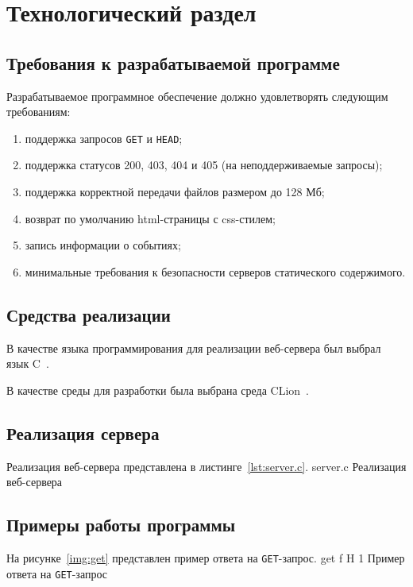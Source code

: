 \chapter{Технологический раздел}

\section{Требования к разрабатываемой программе}

Разрабатываемое программное обеспечение должно удовлетворять следующим требованиям:
\begin{enumerate}
	\item поддержка запросов \texttt{GET} и \texttt{HEAD};
	\item поддержка статусов 200, 403, 404 и 405 (на неподдерживаемые запросы);
	\item поддержка корректной передачи файлов размером до 128 Мб;
	\item возврат по умолчанию html-страницы с css-стилем;
	\item запись информации о событиях;
	\item минимальные требования к безопасности серверов статического содержимого.
\end{enumerate}

\section{Средства реализации}

В качестве языка программирования для реализации веб-сервера был выбрал язык C~\cite{c}.

В качестве среды для разработки была выбрана среда CLion~\cite{clion}.

\clearpage
\section{Реализация сервера}

Реализация веб-сервера представлена в листинге~\ref{lst:server.c}.
	{server.c}
	{Реализация веб-сервера}

\section{Примеры работы программы}

На рисунке~\ref{img:get} представлен пример ответа на \texttt{GET}-запрос.
	{get}
	{f}
	{H}
	{1\textwidth}
	{Пример ответа на \texttt{GET}-запрос}

